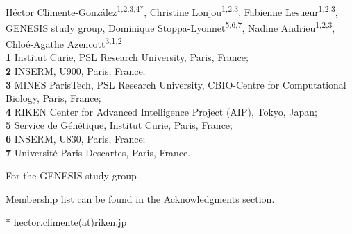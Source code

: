 \documentclass[10pt,letterpaper]{article}
\begin{document}
\vspace*{0.2in}

\begin{flushleft}
{\Large
\textbf{} %
}
\newline
\\
Héctor Climente-González\textsuperscript{1,2,3,4*}, 
Christine Lonjou\textsuperscript{1,2,3}, 
Fabienne Lesueur\textsuperscript{1,2,3},
GENESIS study group\textsuperscript{\textpilcrow},
Dominique Stoppa-Lyonnet\textsuperscript{5,6,7\textcurrency}, 
Nadine Andrieu\textsuperscript{1,2,3}, 
Chloé-Agathe Azencott\textsuperscript{3,1,2}
\\
\bigskip
\textbf{1} Institut Curie, PSL Research University, Paris, France;\\
\textbf{2} INSERM, U900, Paris, France;\\
\textbf{3} MINES ParisTech, PSL Research University, CBIO-Centre for Computational Biology, Paris, France;\\
\textbf{4} RIKEN Center for Advanced Intelligence Project (AIP), Tokyo, Japan; \\
\textbf{5} Service de Génétique, Institut Curie, Paris, France;\\
\textbf{6} INSERM, U830, Paris, France;\\
\textbf{7} Université Paris Descartes, Paris, France.\\
\bigskip

% 
%


\textcurrency For the GENESIS study group %


\textpilcrow Membership list can be found in the Acknowledgments section.

* hector.climente(at)riken.jp

\end{flushleft}
\end{document}
